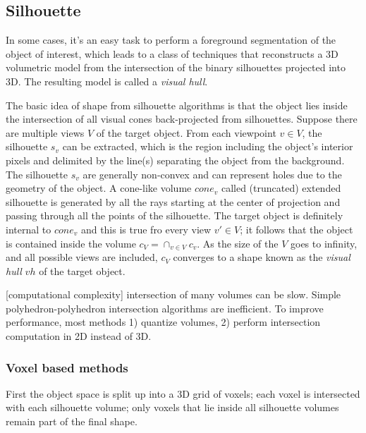\subsection{Silhouette}
In some cases, it's an easy task to perform a foreground segmentation of the object of interest, which leads to a class of techniques that reconstructs a 3D volumetric model from the intersection of the binary silhouettes projected into 3D. The resulting model is called a \textit{visual hull}.

The basic idea of shape from silhouette algorithms is that the object lies inside the intersection of all visual cones back-projected from silhouettes. Suppose there are multiple views $V$ of the target object. From each viewpoint $v\in V$, the silhouette $s_v$ can be extracted, which is the region including the object's interior pixels and delimited by the line(s) separating the object from the background. The silhouette $s_v$ are generally non-convex and can represent holes due to the geometry of the object. A cone-like volume $cone_v$ called (truncated) extended silhouette is generated by all the rays starting at the center of projection and passing through all the points of the silhouette. The target object is definitely internal to $cone_v$ and this is true fro every view $v'\in V$; it follows that the object is contained inside the volume $c_V=\cap_{v\in V}c_v$. As the size of the $V$ goes to infinity, and all possible views are included, $c_V$ converges to a shape known as the \textit{visual hull} $vh$ of the target object.


[computational complexity] intersection of many volumes can be slow. Simple polyhedron-polyhedron intersection algorithms are inefficient. To improve performance, most methods 1) quantize volumes, 2) perform intersection computation in 2D instead of 3D.

\subsubsection{Voxel based methods}
First the object space is split up into a 3D grid of voxels; each voxel is intersected with each silhouette volume; only voxels that lie inside all silhouette volumes remain part of the final shape.

